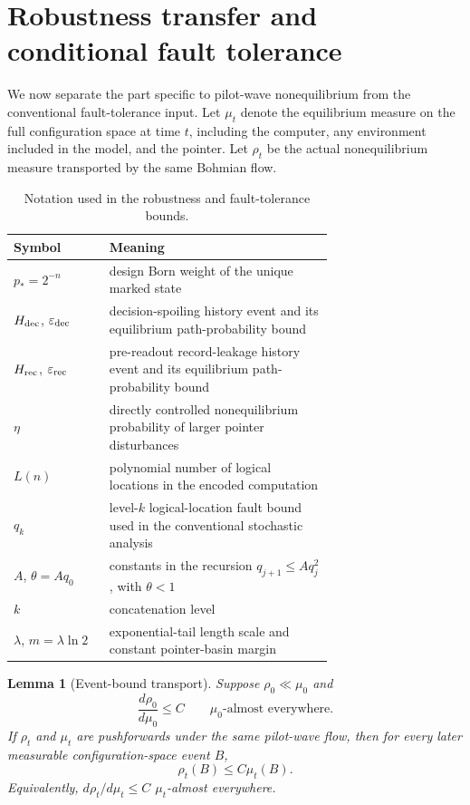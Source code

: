 \documentclass[pdflatex,sn-mathphys-num]{sn-jnl}
\theoremstyle{thmstyleone}
\newtheorem{lemma}{Lemma}
\begin{document}
\section{Robustness transfer and conditional fault tolerance}

We now separate the part specific to pilot-wave nonequilibrium from the conventional fault-tolerance input. Let $\mu_t$ denote the equilibrium measure on the full configuration space at time $t$, including the computer, any environment included in the model, and the pointer. Let $\rho_t$ be the actual nonequilibrium measure transported by the same Bohmian flow.

\begin{table}[t]
\caption{Notation used in the robustness and fault-tolerance bounds.}
\label{tab:notation}
\centering
\begin{tabular}{@{}lp{0.70\linewidth}@{}}
\toprule
Symbol & Meaning \\
\midrule
$p_*=2^{-n}$ & design Born weight of the unique marked state \\
$H_{\rm dec}$, $\varepsilon_{\rm dec}$ & decision-spoiling history event and its equilibrium path-probability bound \\
$H_{\rm rec}$, $\varepsilon_{\rm rec}$ & pre-readout record-leakage history event and its equilibrium path-probability bound \\
$\eta$ & directly controlled nonequilibrium probability of larger pointer disturbances \\
$L(n)$ & polynomial number of logical locations in the encoded computation \\
$q_k$ & level-$k$ logical-location fault bound used in the conventional stochastic analysis \\
$A$, $\theta=Aq_0$ & constants in the recursion $q_{j+1}\le Aq_j^2$, with $\theta<1$ \\
$k$ & concatenation level \\
$\lambda$, $m=\lambda\ln2$ & exponential-tail length scale and constant pointer-basin margin \\
\bottomrule
\end{tabular}
\end{table}

\begin{lemma}[Event-bound transport]
\label{lem:eventtransport}
Suppose $\rho_0\ll\mu_0$ and
\begin{equation}
\frac{d\rho_0}{d\mu_0}\le C
\qquad \mu_0\text{-almost everywhere}.
\label{eq:initialRN}
\end{equation}
If $\rho_t$ and $\mu_t$ are pushforwards under the same pilot-wave flow, then for every later measurable configuration-space event $B$,
\begin{equation}
\rho_t(B)\le C\mu_t(B).
\label{eq:eventBound}
\end{equation}
Equivalently, $d\rho_t/d\mu_t\le C$ $\mu_t$-almost everywhere.
\end{lemma}
\end{document}
